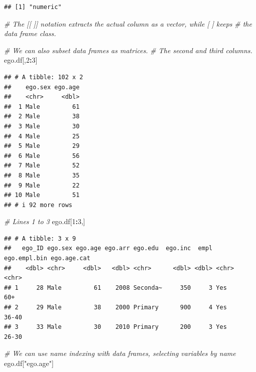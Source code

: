 \documentclass[
]{book}
\newenvironment{Shaded}{\begin{snugshade}}{\end{snugshade}}
\newcommand{\CommentTok}[1]{\textcolor[rgb]{0.56,0.35,0.01}{\textit{#1}}}
\newcommand{\DecValTok}[1]{\textcolor[rgb]{0.00,0.00,0.81}{#1}}
\newcommand{\NormalTok}[1]{#1}
\newcommand{\SpecialCharTok}[1]{\textcolor[rgb]{0.81,0.36,0.00}{\textbf{#1}}}
\newcommand{\StringTok}[1]{\textcolor[rgb]{0.31,0.60,0.02}{#1}}
\begin{document}
\begin{verbatim}
## [1] "numeric"
\end{verbatim}

\begin{Shaded}
\begin{Highlighting}[]
\CommentTok{\# The [[ ]] notation extracts the actual column as a vector, while [ ] keeps}
\CommentTok{\# the data frame class.}

\CommentTok{\# We can also subset data frames as matrices.}
\CommentTok{\# The second and third columns.}
\NormalTok{ego.df[,}\DecValTok{2}\SpecialCharTok{:}\DecValTok{3}\NormalTok{]}
\end{Highlighting}
\end{Shaded}

\begin{verbatim}
## # A tibble: 102 x 2
##    ego.sex ego.age
##    <chr>     <dbl>
##  1 Male         61
##  2 Male         38
##  3 Male         30
##  4 Male         25
##  5 Male         29
##  6 Male         56
##  7 Male         52
##  8 Male         35
##  9 Male         22
## 10 Male         51
## # i 92 more rows
\end{verbatim}

\begin{Shaded}
\begin{Highlighting}[]
\CommentTok{\# Lines 1 to 3}
\NormalTok{ego.df[}\DecValTok{1}\SpecialCharTok{:}\DecValTok{3}\NormalTok{,]}
\end{Highlighting}
\end{Shaded}

\begin{verbatim}
## # A tibble: 3 x 9
##   ego_ID ego.sex ego.age ego.arr ego.edu  ego.inc  empl ego.empl.bin ego.age.cat
##    <dbl> <chr>     <dbl>   <dbl> <chr>      <dbl> <dbl> <chr>        <chr>      
## 1     28 Male         61    2008 Seconda~     350     3 Yes          60+        
## 2     29 Male         38    2000 Primary      900     4 Yes          36-40      
## 3     33 Male         30    2010 Primary      200     3 Yes          26-30
\end{verbatim}

\begin{Shaded}
\begin{Highlighting}[]
\CommentTok{\# We can use name indexing with data frames, selecting variables by name}
\NormalTok{ego.df[}\StringTok{"ego.age"}\NormalTok{]}
\end{Highlighting}
\end{Shaded}
\end{document}
